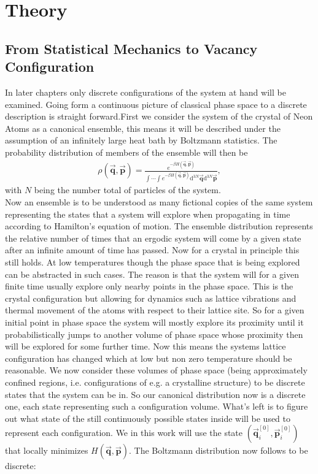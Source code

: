 \chapter{Theory}
\label{chap:Theory}
%
\section{From Statistical Mechanics to Vacancy Configuration} In later chapters only discrete configurations of the system at hand will be examined. Going form a continuous picture of classical phase space to a discrete description is straight forward.First we consider the system of the crystal of Neon Atoms as a canonical ensemble, this means it will be described under the assumption of an infinitely large heat bath by Boltzmann statistics. The probability distribution of members of the ensemble will then be 
\begin{align}
	\rho(\vec{\mathbf{q}},\vec{\mathbf{p}})=\frac{e^{-\beta H(\vec{\mathbf{q}},\vec{\mathbf{p}})}}{\int\cdots\int e^{-\beta H(\vec{\mathbf{q}},\vec{\mathbf{p}})}\mathrm{d}^{3N}\vec{\mathbf{q}}\mathrm{d}^{3N}\vec{\mathbf{p}}},
\end{align}
with $N$ being the number total of particles of the system.\\
Now an ensemble is to be understood as many fictional copies of the same system representing the states that a system will explore when propagating in time according to Hamilton's equation of motion. The ensemble distribution represents the relative number of times that an ergodic system will come by a given state after an infinite amount of time has passed. Now for a crystal in principle this still holds. At low temperatures though the phase space that is being explored can be abstracted in such cases. The reason is that the system will for a given finite time usually explore only nearby points in the phase space. This is the crystal configuration but allowing for dynamics such as lattice vibrations and thermal movement of the atoms with respect to their lattice site. So for a given initial point in phase space the system will mostly explore its proximity until it probabilistically jumps to another volume of phase space whose proximity then will be explored for some further time. Now this means the systems lattice configuration has changed which at low but non zero temperature should be reasonable. 
We now consider these volumes of phase space (being approximately confined regions, i.e. configurations of e.g. a crystalline structure) to be discrete states that the system can be in. So our canonical distribution now is a discrete one, each state representing such a configuration volume. What's left is to figure out what state of the still continuously possible states inside will be used to represent each configuration. We in this work will use the state $(\vec{\mathbf{q}}_{i}^{[0]},\vec{\mathbf{p}}_{i}^{[0]})$ that locally minimizes $H(\vec{\mathbf{q}},\vec{\mathbf{p}})$. The Boltzmann distribution now follows to be discrete:
